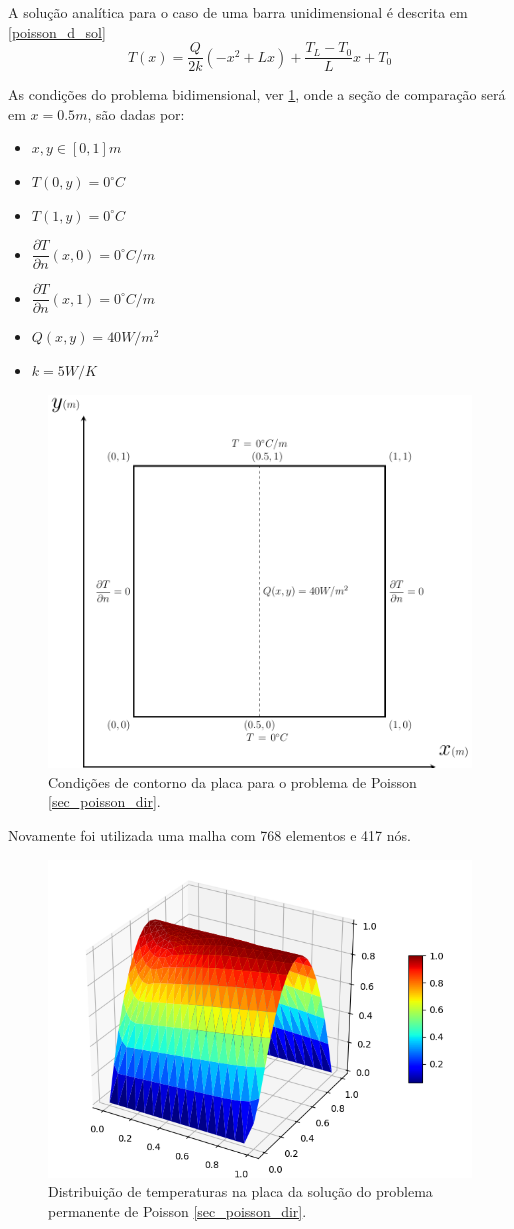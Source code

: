 A solução analítica para o caso de uma barra unidimensional é descrita em \ref{poisson_d_sol}
\begin{equation}
    T(x) = \dfrac{Q}{2k}\left(-x^2 + L x\right) + \dfrac{T_L-T_0}{L} x + T_0
    \label{poisson_d_sol} 
\end{equation}

As condições do problema bidimensional, ver \ref{poisson_d_bc}, onde a seção de comparação será em $x=0.5m$, são dadas por:
\begin{itemize}
    \item $x,y\in [0,1]m$
    \item $T(0,y) = 0^{\circ}C$
    \item $T(1,y) = 0^{\circ}C$
    \item $\dfrac{\partial T}{\partial n}(x,0) = 0^{\circ}C/m$
    \item $\dfrac{\partial T}{\partial n}(x,1) = 0^{\circ}C/m$
    \item $Q(x,y) = 40W/m^2$
    \item $k = 5W/K$
\end{itemize}

\begin{figure}[H]
    \centering
    \includegraphics[width=.7\linewidth]{figures/poisson_dirichlet_boundary_conditions.pdf}
    \caption{Condições de contorno da placa para o problema de Poisson \ref{sec_poisson_dir}.}
    \label{poisson_d_bc}
\end{figure}

Novamente foi utilizada uma malha com 768 elementos e 417 nós.
\begin{figure}[H]
    \centering
    \includegraphics[width=.5\linewidth]{figures/poisson_dirichlet_permanent_3d.png}
    \caption{Distribuição de temperaturas na placa da solução do problema permanente de Poisson \ref{sec_poisson_dir}.}
    \label{poisson_d_3d}
\end{figure}

